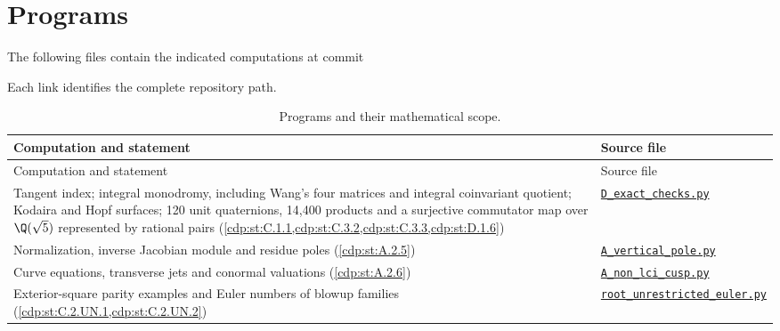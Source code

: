 \section*{Programs}
The following files contain the indicated computations at commit
\begin{center}\small\ttfamily\SsixRepositoryCommit\end{center}
Each link identifies the complete repository path.

{\footnotesize
\renewcommand{\arraystretch}{.9}
\setlength{\tabcolsep}{4pt}
\begin{longtable}{@{}>{\raggedright\arraybackslash}p{}>{\raggedright\arraybackslash}p{}@{}}
\caption{Programs and their mathematical scope.}\label{tab:II:programs}\\
\toprule Computation and statement & Source file \\
\midrule\endfirsthead
\toprule Computation and statement & Source file \\
\midrule\endhead
\bottomrule\endfoot
Tangent index; integral monodromy, including Wang's four matrices and integral coinvariant quotient; Kodaira and Hopf surfaces; 120 unit quaternions, 14,400 products and a surjective commutator map over $\Q(\sqrt5)$ represented by rational pairs (\cref{cdp:st:C.1.1,cdp:st:C.3.2,cdp:st:C.3.3,cdp:st:D.1.6}) & \href{https://raw.githubusercontent.com/KokunoYumeto/s6-complex-structure-workbench/\SsixRepositoryCommit/pro_returns/S6_03_CDP_checkpoint_13_20261116T0136Z/S6_03_CDP/code/D_exact_checks.py}{\nolinkurl{D_exact_checks.py}} \\[3pt]
Normalization, inverse Jacobian module and residue poles (\cref{cdp:st:A.2.5}) & \href{https://raw.githubusercontent.com/KokunoYumeto/s6-complex-structure-workbench/\SsixRepositoryCommit/pro_returns/S6_03_CDP_checkpoint_13_20261116T0136Z/S6_03_CDP/code/A_vertical_pole.py}{\nolinkurl{A_vertical_pole.py}} \\[3pt]
Curve equations, transverse jets and conormal valuations (\cref{cdp:st:A.2.6}) & \href{https://raw.githubusercontent.com/KokunoYumeto/s6-complex-structure-workbench/\SsixRepositoryCommit/pro_returns/S6_03_CDP_checkpoint_13_20261116T0136Z/S6_03_CDP/code/A_non_lci_cusp.py}{\nolinkurl{A_non_lci_cusp.py}} \\[3pt]
Exterior-square parity examples and Euler numbers of blowup families (\cref{cdp:st:C.2.UN.1,cdp:st:C.2.UN.2}) & \href{https://raw.githubusercontent.com/KokunoYumeto/s6-complex-structure-workbench/\SsixRepositoryCommit/pro_returns/S6_03_CDP_checkpoint_13_20261116T0136Z/S6_03_CDP/code/root_unrestricted_euler.py}{\nolinkurl{root_unrestricted_euler.py}} \\[3pt]

\end{longtable}}
